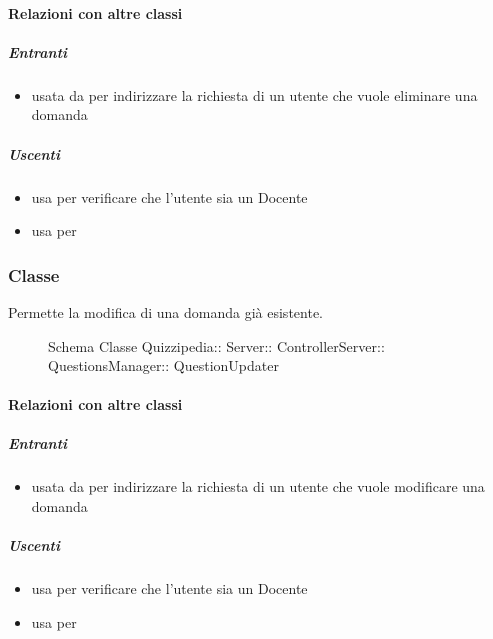 \paragraph{Relazioni con altre classi}
\subparagraph{Entranti}
\begin{itemize}
\item usata da  per indirizzare la richiesta di un utente che vuole eliminare una domanda
\end{itemize}
\subparagraph{Uscenti}
\begin{itemize}
\item usa  per verificare che l'utente sia un Docente
\item usa  per 
\end{itemize}
\subsubsection{Classe }
Permette la modifica di una domanda già esistente.
\begin{figure}[H]
\centering
\noindent{}
\caption[Schema Classe QuestionUpdater]{Schema Classe Quizzipedia:: Server:: ControllerServer:: QuestionsManager:: QuestionUpdater}
\end{figure}
\paragraph{Relazioni con altre classi}
\subparagraph{Entranti}
\begin{itemize}
\item usata da  per indirizzare la richiesta di un utente che vuole modificare una domanda
\end{itemize}
\subparagraph{Uscenti}
\begin{itemize}
\item usa  per verificare che l'utente sia un Docente
\item usa  per 
\end{itemize}
